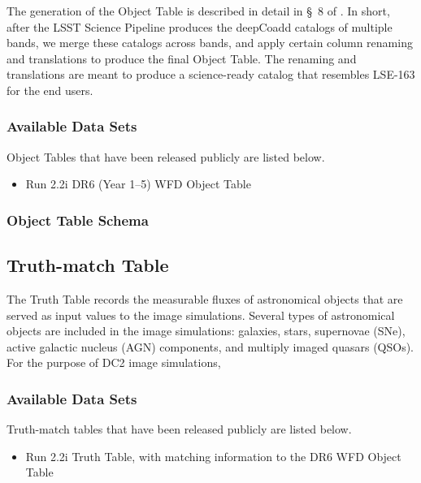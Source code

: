 \documentclass[11pt]{report}
\begin{document}
The generation of the Object Table is described in detail in \S~8 of \cite{2020arXiv201005926L}. In short, after the LSST Science Pipeline produces the deepCoadd catalogs of multiple bands, we merge these catalogs across bands, and apply certain column renaming and translations to produce the final Object Table. The renaming and translations are meant to produce a science-ready catalog that resembles LSE-163 for the end users. 

\subsubsection{Available Data Sets}

Object Tables that have been released publicly are listed below.

\begin{itemize}
  \item Run 2.2i DR6 (Year 1--5) WFD Object Table
\end{itemize}

\subsubsection{Object Table Schema}



\subsection{Truth-match Table}
\label{sec:truth}

The Truth Table records the measurable fluxes of astronomical objects that are served as input values to the image simulations. Several types of astronomical objects are included in the image simulations: galaxies, stars, supernovae (SNe), active galactic nucleus (AGN) components, and multiply imaged quasars (QSOs). For the purpose of DC2 image simulations, 


\subsubsection{Available Data Sets}

Truth-match tables that have been released publicly are listed below.

\begin{itemize}
  \item Run 2.2i Truth Table, with matching information to the DR6 WFD Object Table
\end{itemize}
\end{document}
